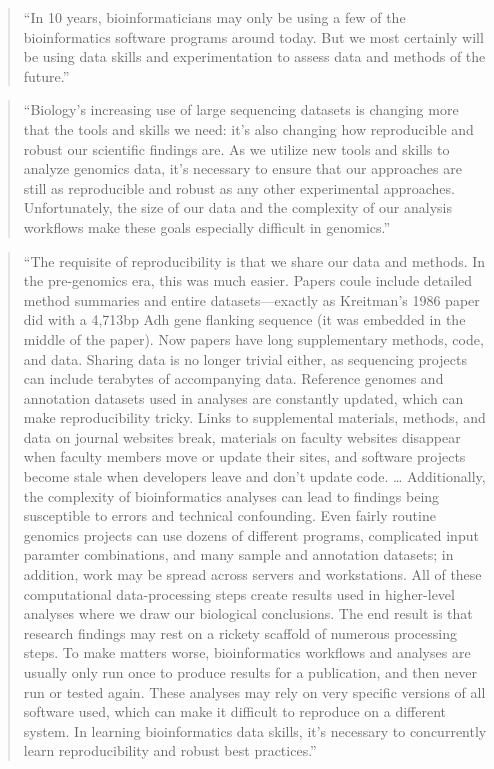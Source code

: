 \documentclass[]{tufte-book}
\begin{document}
\begin{quote}
``In 10 years, bioinformaticians may only be using a few of the bioinformatics
software programs around today. But we most certainly will be using data skills and
experimentation to assess data and methods of the future.'' \citep{buffalo2015bioinformatics}
\end{quote}

\begin{quote}
``Biology's increasing use of large sequencing datasets is changing more that the tools
and skills we need: it's also changing how reproducible and robust our scientific
findings are. As we utilize new tools and skills to analyze genomics data, it's
necessary to ensure that our approaches are still as reproducible and robust as
any other experimental approaches. Unfortunately, the size of our data and the complexity
of our analysis workflows make these goals especially difficult in genomics.''
\citep{buffalo2015bioinformatics}
\end{quote}

\begin{quote}
``The requisite of reproducibility is that we share our data and methods. In the pre-genomics
era, this was much easier. Papers coule include detailed method summaries and entire
datasets---exactly as Kreitman's 1986 paper did with a 4,713bp Adh gene flanking sequence
(it was embedded in the middle of the paper). Now papers have long supplementary methods,
code, and data. Sharing data is no longer trivial either, as sequencing projects can include
terabytes of accompanying data. Reference genomes and annotation datasets used in analyses are
constantly updated, which can make reproducibility tricky. Links to supplemental materials,
methods, and data on journal websites break, materials on faculty websites disappear when
faculty members move or update their sites, and software projects become stale when
developers leave and don't update code. \ldots{} Additionally, the complexity of bioinformatics
analyses can lead to findings being susceptible to errors and technical confounding.
Even fairly routine genomics projects can use dozens of different programs, complicated
input paramter combinations, and many sample and annotation datasets; in addition, work
may be spread across servers and workstations. All of these computational data-processing
steps create results used in higher-level analyses where we draw our biological conclusions.
The end result is that research findings may rest on a rickety scaffold of numerous
processing steps. To make matters worse, bioinformatics workflows and analyses are usually
only run once to produce results for a publication, and then never run or tested again.
These analyses may rely on very specific versions of all software used, which can make it
difficult to reproduce on a different system. In learning bioinformatics data skills, it's
necessary to concurrently learn reproducibility and robust best practices.''
\citep{buffalo2015bioinformatics}
\end{quote}
\end{document}
